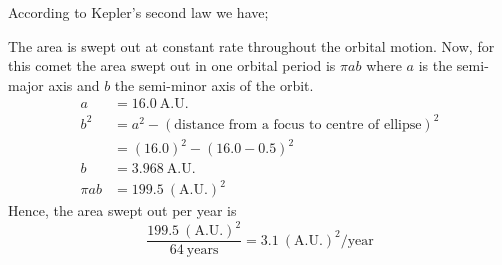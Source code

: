 According to Kepler's second law we have;

The area is swept out at constant rate throughout the orbital motion.
Now, for this comet the area swept out in one orbital period is $\pi ab$ where
$a$ is the semi-major axis and $b$ the semi-minor axis of the orbit.
\begin{align*}
  a &= 16.0\ \text{A.U.} \\
  b^2 &= a^2 - (\text{distance from a focus to centre of ellipse})^2 \\
  &= (16.0)^2 - (16.0 - 0.5)^2 \\
  b &= 3.968\ \text{A.U.} \\
  \pi ab &= 199.5\ (\text{A.U.})^2
\end{align*}
Hence, the area swept out per year is
\[
  \frac{199.5\ (\text{A.U.})^2}{64\ \text{years}}
  = 3.1\ (\text{A.U.})^2/\text{year}
\]
